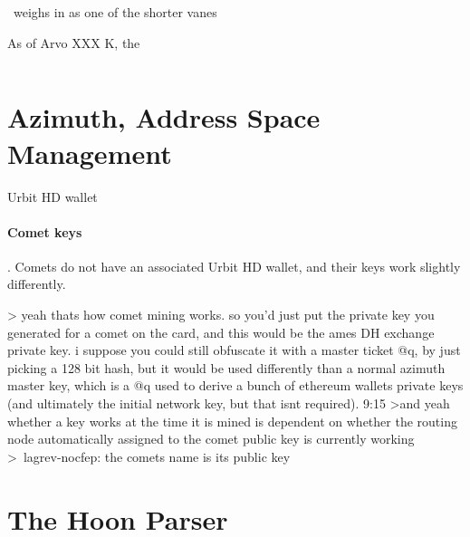 
\jael~weighs in as one of the shorter vanes

As of Arvo XXX K, the

\begin{lstlisting}

\end{lstlisting}

\section[Azimuth]{Azimuth, Address Space Management}

Urbit HD wallet


\paragraph{Comet keys}.  Comets do not have an associated Urbit HD wallet, and their keys work slightly differently.

> yeah thats how comet mining works. so you'd just put the private key you generated for a comet on the card, and this would be the ames DH exchange private key. i suppose you could still obfuscate it with a master ticket @q, by just picking a 128 bit hash, but it would be used differently than a normal azimuth master key, which is a @q used to derive a bunch of ethereum wallets private keys (and ultimately the initial network key, but that isnt required).
9:15
>and yeah whether a key works at the time it is mined is dependent on whether the routing node automatically assigned to the comet public key is currently working
>~lagrev-nocfep: the comets name is its public key


\section[Hoon Parser]{The Hoon Parser}
